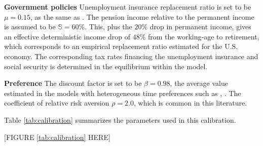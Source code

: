 \textbf{Government policies} Unemployment insurance replacement ratio is set to be $\mu=0.15$, as the same as \cite{krueger2016macroeconomics}.  
The pension income relative to the permanent income is assumed to be $\mathbb{S}=60\%$. This, plus the $ 20\%$ drop in permanent income, gives an effective deterministic income drop of $48\%$ from the working-age to retirement, which corresponds to an empirical replacement ratio estimated for the U.S. economy. The corresponding tax rates financing the unemployment insurance and social security is determined in the equilibrium within the model. 

\textbf{Preference} The discount factor is set to be $\beta=0.98$, the average value estimated in the models with heterogeneous time preferences such as \cite{carroll2017distribution}, \cite{krueger2016macroeconomics}. The coefficient of relative risk aversion $\rho=2.0$, which is common in this literature. 

Table \ref{tab:calibration} summarizes the parameters used in this calibration. 

\begin{center}
[FIGURE \ref{tab:calibration} HERE]
\end{center}